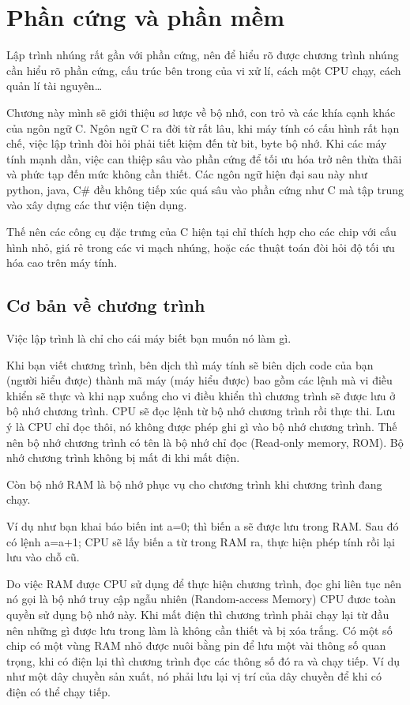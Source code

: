 \chapter{Phần cứng và phần mềm}

Lập trình nhúng rất gần với phần cứng, nên để hiểu rõ được chương trình nhúng cần hiểu rõ phần cứng, cấu trúc bên trong của vi xử lí, cách một CPU chạy, cách quản lí tài nguyên\dots

Chương này mình sẽ giới thiệu sơ lược về bộ nhớ, con trỏ và các khía cạnh khác của ngôn ngữ C. Ngôn ngữ C ra đời từ rất lâu, khi máy tính có cấu hình rất hạn chế, việc lập trình đòi hỏi phải tiết kiệm đến từ bit, byte bộ nhớ. Khi các máy tính mạnh dần, việc can thiệp sâu vào phần cứng để tối ưu hóa trở nên thừa thãi và phức tạp đến mức không cần thiết. Các ngôn ngữ hiện đại sau này như python, java, C\# đều không tiếp xúc quá sâu vào phần cứng như C mà tập trung vào xây dựng các thư viện tiện dụng.

Thế nên các công cụ đặc trưng của C hiện tại chỉ thích hợp cho các chip với cấu hình nhỏ, giá rẻ trong các vi mạch nhúng, hoặc các thuật toán đòi hỏi độ tối ưu hóa cao trên máy tính.

\section{Cơ bản về chương trình}
 
Việc lập trình là chỉ cho cái máy biết bạn muốn nó làm gì.

Khi bạn viết chương trình, bên dịch thì máy tính sẽ biên dịch code của bạn (người hiểu được) thành mã máy (máy hiểu được) bao gồm các lệnh mà vi điều khiển sẽ thực và khi nạp xuống cho vi điều khiển thì chương trình sẽ được lưu ở bộ nhớ chương trình. CPU sẽ đọc lệnh từ bộ nhớ chương trình rồi thực thi. Lưu ý là CPU chỉ đọc thôi, nó không được phép ghi gì vào bộ nhớ chương trình. Thế nên bộ nhớ chương trình có tên là bộ nhớ chỉ đọc (Read-only memory, ROM). Bộ nhớ chương trình không bị mất đi khi mất điện.

Còn bộ nhớ RAM là bộ nhớ phục vụ cho chương trình khi chương trình đang chạy.

Ví dụ như bạn khai báo biến int a=0; thì biến a sẽ được lưu trong RAM. Sau đó có lệnh a=a+1; CPU sẽ lấy biến a từ trong RAM ra, thực hiện phép tính rồi lại lưu vào chỗ cũ.

Do việc RAM được CPU sử dụng để thực hiện chương trình, đọc ghi liên tục nên nó gọi là bộ nhớ truy cập ngẫu nhiên (Random-access Memory) CPU đươc toàn quyền sử dụng bộ nhớ này. Khi mất điện thì chương trình phải chạy lại từ đầu nên những gì được lưu trong làm là không cần thiết và bị xóa trắng. Có một số chip có một vùng RAM nhỏ được nuôi bằng pin để lưu một vài thông số quan trọng, khi có điện lại thì chương trình đọc các thông số đó ra và chạy tiếp. Ví dụ như một dây chuyền sản xuất, nó phải lưu lại vị trí của dây chuyền để khi có điện có thể chạy tiếp.

